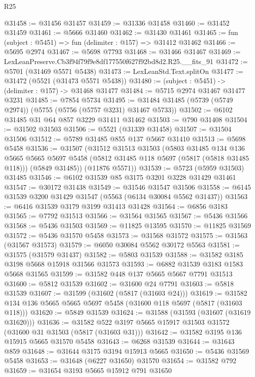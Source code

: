 \begin{lexlean}{R25}
\begin{coremodule}
@31458 := @31456 @31457
@31459 := @31336 @31458
@31460 := @31452 @31459
@31461 := @5666 @31460
@31462 := @31430 @31461
@31465 := fun (subject : @5451) => fun (delimiter : @157) => @31412 @31462
@31466 := @5695 @2974
@31467 := @5698 @7793
@31468 := @31466 @31467
@31469 := LexLeanPreserve.Cb3f94f79f9e8df177550f627f92bd8d2.R25.__fits_91
@31472 := @5701 (@31469 @5571 @5438)
@31473 := LexLeanStd.Text.splitOn
@31477 := @31472 (@5521 (@31473 @5571 @5438))
@31480 := (subject : @5451) -> (delimiter : @157) -> @31468 @31477
@31484 := @5715 @2974 @31467 @31477 @3231
@31485 := @7854 @5734
@31495 := @31484 @31485 (@5739 (@5749 @2974)) (@5755 (@5756 (@5757 @3231) @31467 @5733))
@31502 := @6102 @31485 @31 @64 @857 @3229 @31411 @31462
@31503 := @790 @31408
@31504 := @31502 @31503
@31506 := @5521 (@31339 @31458)
@31507 := @31504 @31506
@31512 := @5789 @31485 @855 @137 @5667 @31410
@31513 := @5698 @5458
@31536 := @31507
    (@31512
      @31513
      @31503
      (@5803
        @31485
        @134
        @136
        @5665
        @5665
        @5697
        @5458
        (@5812 @31485 @118 @5697 (@5817 (@5818 @31485 @118)))
        (@5849 @31485))
      (@11876 @5571))
@31539 := @5723 (@5959 @31503) @31485
@31546 := @6102 @31539 @85 @3175 @3201 @3228 @31429 @31461
@31547 := @30172 @31438
@31549 := @31546 @31547 @31506
@31558 := @6145 @31539 @3200 @31429 @31547 (@5563 (@6134 @30084 @5562 @31437))
@31563 := @6416 @31539 @3179 @3199 @31413 @31428
@31564 := @6856 @3183
@31565 := @7792 @31513
@31566 := @31564 @31565
@31567 := @5436 @31566
@31568 := @5436 @31503
@31569 := @11825 @13595
@31570 := @11825 @31569
@31572 := @5436 @31570 @5458
@31573 := @31568 @31572
@31575 := @31563 (@31567 @31573)
@31579 := @6050 @30084 @5562 @30172 @5563
@31581 := @31575 (@31579 @31437)
@31582 := @5803 @31539
@31588 := @31582 @3185 @3198 @5668 @15918 @31566 @31573
@31593 := @6882 @31539 @3183 @1583 @5668 @31565
@31599 := @31582 @448 @137 @5665 @5667 @7791 @31513
@31600 := @5812 @31539
@31602 := @31600 @24 @7791
@31603 := @5818 @31539
@31607 := @31599 (@31602 (@5817 (@31603 @24)))
@31619 := @31582 @134 @136 @5665 @5665 @5697 @5458 (@31600 @118 @5697 (@5817 (@31603 @118)))
@31620 := @5849 @31539
@31624 := @31588 (@31593 (@31607 (@31619 @31620)))
@31636 := @31582 @522 @3197 @5665 @15917 @31503 @31572 (@31600 @31 @31503 (@5817 (@31603 @31)))
@31642 := @31582 @3195 @136 @15915 @5665 @31570 @5458
@31643 := @6268 @31539
@31644 := @31643 @859
@31648 := @31644 @3175 @3194 @15913 @5665
@31650 := @5436 @31569 @5458
@31653 := @31648 (@6227 @31650) @31570
@31654 := @31582 @792
@31659 := @31654 @3193 @5665 @15912 @791 @31650

\end{coremodule}
\end{lexlean}
